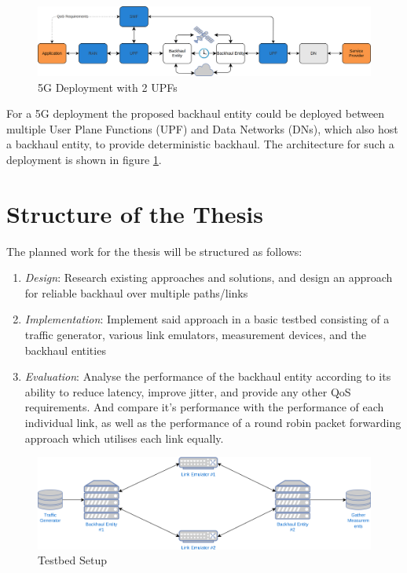 \begin{figure}[h]
    \centering
        \includegraphics[width=\textwidth]{fig/telco-use-case-2.png}
        \caption{5G Deployment with 2 UPFs}
        \label{fig:telco}
\end{figure}

For a 5G deployment the proposed backhaul entity could be deployed between multiple User Plane Functions (UPF) and Data Networks (DNs), which also host a backhaul entity, to provide deterministic backhaul. The architecture for such a deployment is shown in figure \ref{fig:telco}.

\section{Structure of the Thesis}
\label{sec:structure}

The planned work for the thesis will be structured as follows:

\begin{enumerate}
\item{\textit{Design}: Research existing approaches and solutions, and design an approach for reliable backhaul over multiple paths/links}
\item{\textit{Implementation}: Implement said approach in a basic testbed consisting of a traffic generator, various link emulators, measurement devices, and the backhaul entities}
\item{\textit{Evaluation}: Analyse the performance of the backhaul entity according to its ability to reduce latency, improve jitter, and provide any other QoS requirements. And compare it's performance with the performance of each individual link, as well as the performance of a round robin packet forwarding approach which utilises each link equally.}

\end{enumerate}

\begin{figure}[h]
    \centering
        \includegraphics[width=\textwidth]{fig/testbed.png}
        \caption{Testbed Setup}
        \label{fig:testbed}
\end{figure}

